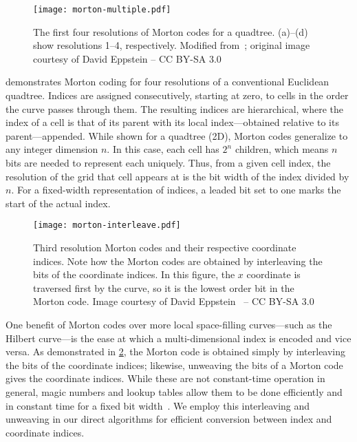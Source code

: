 \begin{figure}[ht!]
	\centering
	\texttt{[image: morton-multiple.pdf]}
	\caption[Four resolutions of Morton codes]{
		The first four resolutions of Morton codes for a quadtree.
		(a)--(d) show resolutions 1--4, respectively.
		Modified from~\cite{morton-multiple}; original image courtesy of David Eppstein -- CC BY-SA 3.0
	}
	\label{fig:morton-multiple}
\end{figure}


 demonstrates Morton coding for four resolutions of a conventional Euclidean quadtree.
Indices are assigned consecutively, starting at zero, to cells in the order the curve passes through them.
The resulting indices are hierarchical, where the index of a cell is that of its parent with its local index---obtained relative to its parent---appended.
While shown for a quadtree (2D), Morton codes generalize to any integer dimension $n$.
In this case, each cell has $2^n$ children, which means $n$ bits are needed to represent each uniquely.
Thus, from a given cell index, the resolution of the grid that cell appears at is the bit width of the index divided by $n$.
For a fixed-width representation of indices, a leaded bit set to one marks the start of the actual index.


\begin{figure}[htp!]
	\centering
	\texttt{[image: morton-interleave.pdf]}
	\caption[Morton codes by bit-interleaving]{
		Third resolution Morton codes and their respective coordinate indices.
		Note how the Morton codes are obtained by interleaving the bits of the coordinate indices.
		In this figure, the $x$ coordinate is traversed first by the curve, so it is the lowest order bit in the Morton code.
		Image courtesy of David Eppstein~\cite{morton-interleave} -- CC BY-SA 3.0
	}
	\label{fig:morton-interleave}
\end{figure}


One benefit of Morton codes over more local space-filling curves---such as the Hilbert curve---is the ease at which a multi-dimensional index is encoded and vice versa.
As demonstrated in \cref{fig:morton-interleave}, the Morton code is obtained simply by interleaving the bits of the coordinate indices; likewise, unweaving the bits of a Morton code gives the coordinate indices.
While these are not constant-time operation in general, magic numbers and lookup tables allow them to be done efficiently and in constant time for a fixed bit width~\cite{libmorton18}.
We employ this interleaving and unweaving in our direct algorithms for efficient conversion between index and coordinate indices.%


